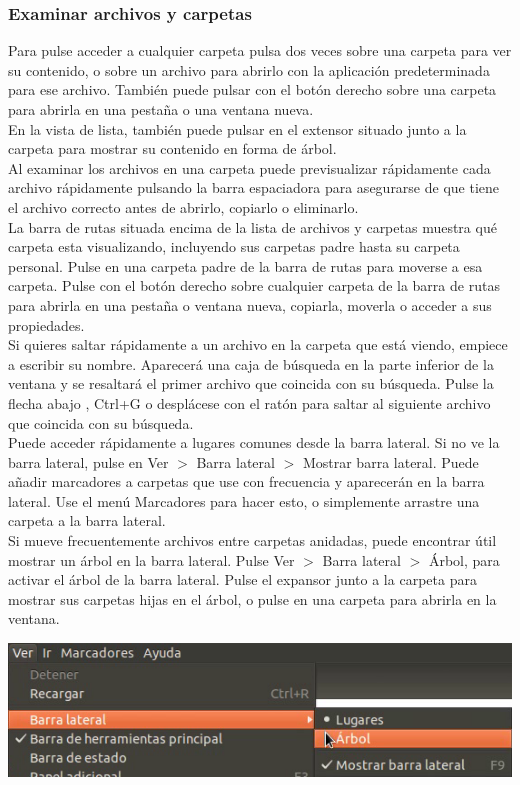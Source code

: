 \subsubsection{Examinar archivos y carpetas}
Para pulse acceder a cualquier carpeta pulsa dos veces sobre una carpeta para ver su contenido, o sobre un archivo para abrirlo con la aplicación predeterminada para ese archivo. También puede pulsar con el botón derecho sobre una carpeta para abrirla en una pestaña o una ventana nueva.\\ 
En la vista de lista, también puede pulsar en el extensor situado junto a la carpeta para mostrar su contenido en forma de árbol.\\
Al examinar los archivos en una carpeta puede previsualizar rápidamente cada archivo rápidamente pulsando la barra espaciadora para asegurarse de que tiene el archivo correcto antes de abrirlo, copiarlo o eliminarlo.\\
La barra de rutas situada encima de la lista de archivos y carpetas muestra qué carpeta esta visualizando, incluyendo sus carpetas padre hasta su carpeta personal. Pulse en una carpeta padre de la barra de rutas para moverse a esa carpeta. Pulse con el botón derecho sobre cualquier carpeta de la barra de rutas para abrirla en una pestaña o ventana nueva, copiarla, moverla o acceder a sus propiedades.\\
Si quieres saltar rápidamente a un archivo en la carpeta que está viendo, empiece a escribir su nombre. Aparecerá una caja de búsqueda en la parte inferior de la ventana y se resaltará el primer archivo que coincida con su búsqueda. Pulse la flecha abajo , Ctrl+G o desplácese con el ratón para saltar al siguiente archivo que coincida con su búsqueda.\\
Puede acceder rápidamente a lugares comunes desde la barra lateral. Si no ve la barra lateral, pulse en Ver $>$ Barra lateral $>$ Mostrar barra lateral. Puede añadir marcadores a carpetas que use con frecuencia y aparecerán en la barra lateral. Use el menú Marcadores para hacer esto, o simplemente arrastre una carpeta a la barra lateral.\\
Si mueve frecuentemente archivos entre carpetas anidadas, puede encontrar útil mostrar un árbol en la barra lateral. Pulse Ver $>$ Barra lateral $>$ Árbol, para activar el árbol de la barra lateral. Pulse el expansor junto a la carpeta para mostrar sus carpetas hijas en el árbol, o pulse en una carpeta para abrirla en la ventana.
\begin{center}
\includegraphics[scale=0.8]{img/bl.png}
\end{center}

